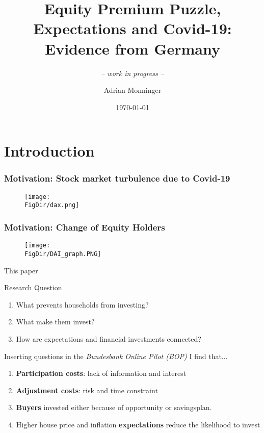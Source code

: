 \documentclass[pdflatex]{beamer}
\title[EPP, Expectations and Covid-19] {Equity Premium Puzzle, Expectations and Covid-19:\\ Evidence from Germany}
\subtitle{ \vspace{0.25em} \textit{-- work in progress --} }
\author[A. Monninger]{Adrian Monninger\inst{1}}
\institute[]{\inst{1} Johns Hopkins University}
\date{\today}
\begin{document}

\begin{frame}
	\titlepage
\end{frame}


\section{Introduction}
\begin{frame}[label = motivation_2]
	\frametitle{Motivation: Stock market turbulence due to Covid-19}
	\begin{figure}
		\centering
		\texttt{[image: \\FigDir/dax.png]}
	\end{figure}
	\hyperlink{sp500}{}
	\hyperlink{eurostoxx50}{}
\end{frame}

\begin{frame}[label = motivation_2]
	\frametitle{Motivation: Change of Equity Holders}
	\begin{figure}
		\centering
		\texttt{[image: \\FigDir/DAI\_graph.PNG]}
	\end{figure}
\end{frame}

\begin{frame}{This paper}
	
	\begin{block}{Research Question}
		{\begin{enumerate}
				\item What prevents households from investing?
				\item What make them invest?
				\item How are expectations and financial investments connected?
		\end{enumerate}}
	\end{block}
	\vspace{1em}
	\pause
	\begin{block}{Inserting questions in the \textit{Bundesbank Online Pilot (BOP)} I find that...}
		{
			\pause
			\begin{enumerate}
				\item \textbf{Participation costs}: lack of information and interest
				\item \textbf{Adjustment costs}: risk and time constraint
				\item \textbf{Buyers} invested either because of opportunity or savingsplan. 
				\item Higher house price and inflation \textbf{expectations} reduce the likelihood to invest
			\end{enumerate}
		}
		
	\end{block}
\end{frame}
\end{document}
